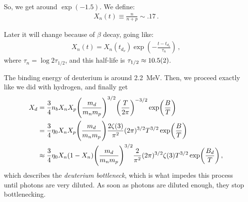\documentclass[main.tex]{subfiles}
\begin{document}
So, we get around \(\exp(-1.5)\).
We define: 
%
\begin{align}
  X_n (t) \equiv \frac{n}{n+p} \sim \num{.17}
\,.
\end{align}

Later it will change because of \(\beta \) decay, going like: 
%
\begin{align}
  X_n(t) = X_n(t_{d_\nu }) \exp( - \frac{t - t_{d_\nu }}{\tau _n})
\,,
\end{align}
%
where \(\tau _n = \log 2 \tau_{1/2}\), and this half-life is \(\tau_{1/2} \approx \num{10.5+-0.2}\).

The binding energy of deuterium is around \SI{2.2}{MeV}.
Then, we proceed exactly like we did with hydrogen, and finally get 
%
\begin{align}
  X_d &= \frac{3}{4} n_b X_n X_p \qty(\frac{m_d}{m_nm_p})^{3/2} \qty(\frac{T}{2 \pi })^{-3/2} \exp(\frac{B}{T}) \\
  &= \frac{3}{4} \eta_0 X_n X_p \qty(\frac{m_d}{m_nm_p})
  \frac{2 \zeta (3)}{\pi^2} (2 \pi )^{3/2} T^{3/2} \exp(\frac{B}{T})  \\
  &\approx \frac{3}{4} \eta_0 X_n (1-X_n) \qty(\frac{m_d}{m_nm_p})^{3/2} \frac{2}{\pi^2} (2 \pi )^{3/2} \zeta (3) T^{3/2} \exp(\frac{B_d}{T})
\,,
\end{align}
%
which describes the \emph{deuterium bottleneck}, which is what impedes this process until photons are very diluted.
As soon as photons are diluted enough, they stop bottlenecking.
\end{document}
